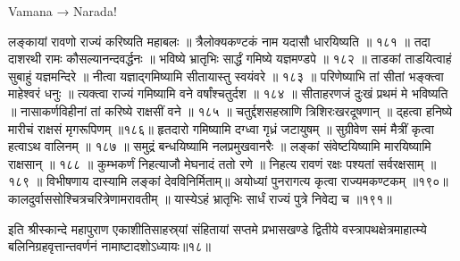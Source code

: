 Vamana → Narada!

लङ्कायां रावणो राज्यं करिष्यति महाबलः ॥
त्रैलोक्यकण्टकं नाम यदासौ धारयिष्यति ॥ १८१ ॥
तदा दाशरथी रामः कौसल्यानन्दवर्द्धनः ॥
भविष्ये भ्रातृभिः सार्द्धं गमिष्ये यज्ञमण्डपे ॥ १८२ ॥
ताडकां ताडयित्वाहं सुबाहुं यज्ञमन्दिरे ॥
नीत्वा यज्ञाद्गमिष्यामि सीतायास्तु स्वयंवरे ॥ १८३ ॥
परिणेष्याभि तां सीतां भङ्क्त्वा माहेश्वरं धनुः ॥
त्यक्त्वा राज्यं गमिष्यामि वने वर्षांश्चतुर्दश ॥ १८४ ॥
सीताहरणजं दुःखं प्रथमं मे भविष्यति ॥
नासाकर्णविहीनां तां करिष्ये राक्षसीं वने ॥ १८५ ॥
चतुर्द्दशसहस्राणि त्रिशिरःखरदूषणान् ॥
द्हत्वा हनिष्ये मारीचं राक्षसं मृगरूपिणम् ॥१८६॥
हृतदारो गमिष्यामि दग्ध्वा गृध्रं जटायुषम् ॥
सुग्रीवेण समं मैत्रीं कृत्वा हत्वाऽथ वालिनम् ॥ १८७ ॥
समुद्रं बन्धयिष्यामि नलप्रमुखवानरैः ॥
लङ्कां संवेष्टयिष्यामि मारयिष्यामि राक्षसान् ॥ १८८ ॥
कुम्भकर्णं निहत्याजौ मेघनादं ततो रणे ॥
निहत्य रावणं रक्षः पश्यतां सर्वरक्षसाम् ॥ १८९ ॥
विभीषणाय दास्यामि लङ्कां देवविनिर्मिताम्॥
अयोध्यां पुनरागत्य कृत्वा राज्यमकण्टकम् ॥१९०॥
कालदुर्वाससोश्चित्रचरित्रेणामरावतीम् ॥
यास्येऽहं भ्रातृभिः सार्धं राज्यं पुत्रे निवेद्य च ॥१९१॥

इति श्रीस्कान्दे महापुराण एकाशीतिसाहस्र्यां संहितायां सप्तमे प्रभासखण्डे द्वितीये वस्त्रापथक्षेत्रमाहात्म्ये बलिनिग्रहवृत्तान्तवर्णनं नामाष्टादशोऽध्यायः॥१८॥
